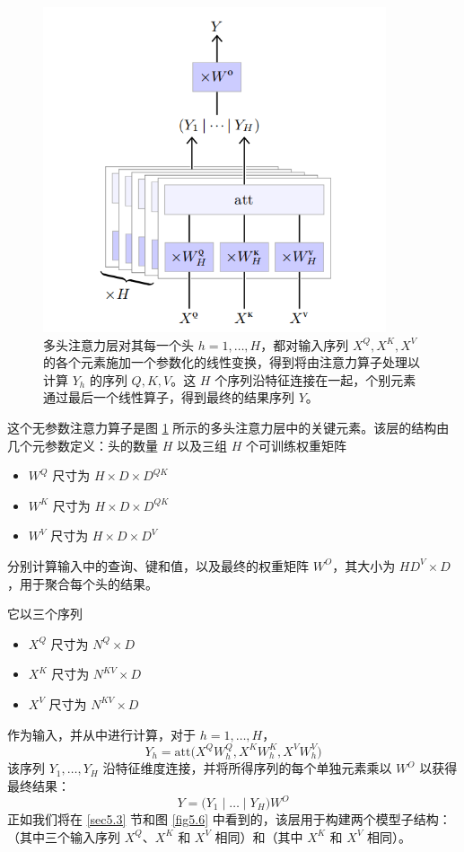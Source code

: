 \begin{figure}
    \centering
    \includegraphics[width=0.9\textwidth]{fig/fig4.13.png}
    \caption[多头注意力层]{多头注意力层对其每一个头 $h = 1,\dots,H$，都对输入序列 $X^Q, X^K, X^V$ 的各个元素施加一个参数化的线性变换，得到将由注意力算子处理以计算 $Y_h$ 的序列 $Q,K,V$。这 $H$ 个序列沿特征连接在一起，个别元素通过最后一个线性算子，得到最终的结果序列 $Y$。}
    \label{fig4.13}
\end{figure}

这个无参数注意力算子是图 \ref{fig4.13} 所示的多头注意力层中的关键元素。该层的结构由几个元参数定义：头的数量 $H$ 以及三组 $H$ 个可训练权重矩阵
\begin{itemize}
    \item $W^Q$ 尺寸为 $H \times D \times D^{QK}$
    \item $W^K$ 尺寸为 $H \times D \times D^{QK}$
    \item $W^V$ 尺寸为 $H \times D \times D^V$
\end{itemize}
分别计算输入中的查询、键和值，以及最终的权重矩阵 $W^O$，其大小为 $HD^V \times D$，用于聚合每个头的结果。

它以三个序列
\begin{itemize}
    \item $X^Q$ 尺寸为 $N^Q \times D$
    \item $X^K$ 尺寸为 $N^{KV} \times D$
    \item $X^V$ 尺寸为 $N^{KV} \times D$
\end{itemize}
作为输入，并从中进行计算，对于 $h = 1,\dots,H$，
\[Y_h = \text{att}\Big(X^QW_h^Q, X^KW_h^K, X^VW_h^V\Big)\]
该序列 $Y_1,\dots,Y_H$ 沿特征维度连接，并将所得序列的每个单独元素乘以 $W^O$ 以获得最终结果：
\[Y = \Big(Y_1 \mid \dots \mid Y_H\Big)W^O\]
正如我们将在 \ref{sec5.3} 节和图 \ref{fig5.6} 中看到的，该层用于构建两个模型子结构：（其中三个输入序列 $X^Q$、$X^K$ 和 $X^V$ 相同）和（其中 $X^K$ 和 $X^V$ 相同）。

